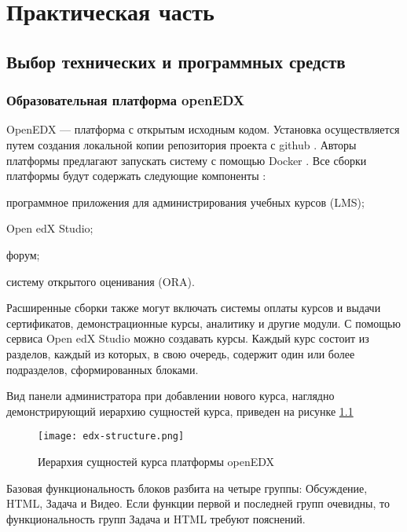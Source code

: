 \chapter{Практическая часть}

\section{Выбор технических и программных средств}
\subsection{Образовательная платформа openEDX}
OpenEDX — платформа с открытым исходным кодом. Установка осуществляется путем создания локальной копии репозитория проекта с github \cite{edx-github}. Авторы платформы предлагают запускать систему с помощью Docker \cite{docker}. Все сборки платформы будут содержать следующие компоненты \cite{edx-install}:
\begin{itemize*}
	\item программное приложения для администрирования учебных курсов (LMS);
	\item Open edX Studio;
	\item форум;
	\item систему открытого оценивания (ORA).
\end{itemize*}

Расширенные сборки также могут включать системы оплаты курсов и выдачи сертификатов, демонстрационные курсы, аналитику и другие модули. С помощью сервиса Open edX Studio можно создавать курсы. Каждый курс состоит из разделов, каждый из которых, в свою очередь, содержит один или более подразделов, сформированных блоками. 

Вид панели администратора при добавлении нового курса, наглядно демонстрирующий иерархию сущностей курса, приведен на рисунке \ref{fig:edx-structure}

\begin{figure}[htbp]
	\centering
	\texttt{[image: edx-structure.png]}
	\caption{Иерархия сущностей курса платформы openEDX}%
	\label{fig:edx-structure}
\end{figure}

Базовая функциональность блоков разбита на четыре группы: Обсуждение, HTML, Задача и Видео. Если функции первой и последней групп очевидны, то функциональность групп Задача и HTML требуют пояснений.

